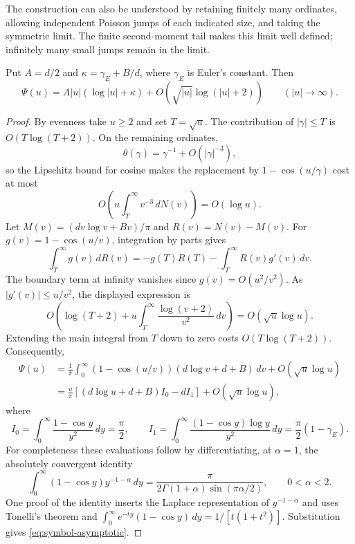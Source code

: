 The construction can also be understood by retaining finitely many
ordinates, allowing independent Poisson jumps of each indicated size,
and taking the symmetric limit. The finite second-moment tail makes this
limit well defined; infinitely many small jumps remain in the limit.

\begin{lemma}\label{lem:continuous-symbol}
Put $A=d/2$ and $\kappa=\gamma_{\!E}+B/d$, where $\gamma_{\!E}$ is
Euler's constant. Then
\begin{equation}\label{eq:symbol-asymptotic}
 \Psi(u)=A|u|(\log|u|+\kappa)
          +O(\sqrt{|u|}\log(|u|+2))
 \qquad(|u|\longrightarrow\infty).
\end{equation}
\end{lemma}

\begin{proof}
By evenness take $u\geq2$ and set $T=\sqrt u$. The contribution of
$|\gamma|\leq T$ is $O(T\log(T+2))$. On the remaining ordinates,
\[
 \theta(\gamma)=\gamma^{-1}+O(|\gamma|^{-3}),
\]
so the Lipschitz bound for cosine makes the replacement by
$1-\cos(u/\gamma)$ cost at most
\[
 O\left(u\int_T^\infty v^{-3}\,dN(v)\right)=O(\log u).
\]
Let $M(v)=(d v\log v+Bv)/\pi$ and $R(v)=N(v)-M(v)$.
For $g(v)=1-\cos(u/v)$, integration by parts gives
\[
 \int_T^\infty g(v)\,dR(v)
 =-g(T)R(T)-\int_T^\infty R(v)g'(v)\,dv.
\]
The boundary term at infinity vanishes since $g(v)=O(u^2/v^2)$.
As $|g'(v)|\leq u/v^2$, the displayed expression is
\[
 O\left(\log(T+2)+u\int_T^\infty
              \frac{\log(v+2)}{v^2}\,dv\right)
 =O(\sqrt u\log u).
\]
Extending the main integral from $T$ down to zero costs
$O(T\log(T+2))$. Consequently,
\begin{align*}
 \Psi(u)
 &=\frac1\pi\int_0^\infty
     (1-\cos(u/v))(d\log v+d+B)\,dv+O(\sqrt u\log u)\\
 &=\frac u\pi\left[(d\log u+d+B)I_0-dI_1\right]
        +O(\sqrt u\log u),
\end{align*}
where
\[
 I_0=\int_0^\infty\frac{1-\cos y}{y^2}\,dy=\frac\pi2,
 \qquad
 I_1=\int_0^\infty\frac{(1-\cos y)\log y}{y^2}\,dy
     =\frac\pi2(1-\gamma_{\!E}).
\]
For completeness these evaluations follow by differentiating, at
$\alpha=1$, the absolutely convergent identity
\[
 \int_0^\infty(1-\cos y)y^{-1-\alpha}\,dy
 =\frac{\pi}{2\Gamma(1+\alpha)\sin(\pi\alpha/2)},
 \qquad 0<\alpha<2.
\]
One proof of the identity inserts the Laplace representation of
$y^{-1-\alpha}$ and uses Tonelli's theorem and
$\int_0^\infty e^{-ty}(1-\cos y)\,dy=1/[t(1+t^2)]$.
Substitution gives \eqref{eq:symbol-asymptotic}.
\end{proof}


